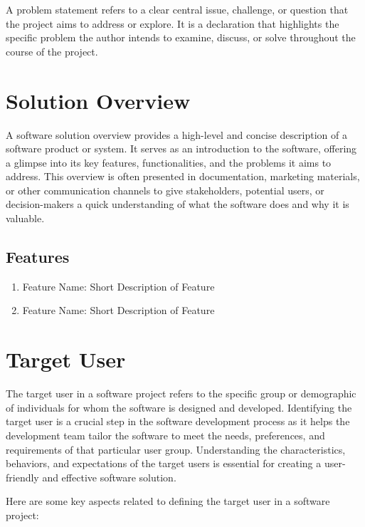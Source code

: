 A problem statement refers to a clear central issue,
challenge, or question that the project aims to address or explore. It is a
declaration that highlights the specific problem the author intends to examine,
discuss, or solve throughout the course of the project.

\section{Solution Overview}
\label{section:solution-overview}

A software solution overview provides a high-level and
concise description of a software product or system. It serves as an
introduction to the software, offering a glimpse into its key features,
functionalities, and the problems it aims to address. This overview is often
presented in documentation, marketing materials, or other communication
channels to give stakeholders, potential users, or decision-makers a quick
understanding of what the software does and why it is valuable.

\subsection{Features}
\label{subsection:features}

\begin{enumerate}[leftmargin=80pt]
    \item Feature Name: Short Description of Feature
    \item Feature Name: Short Description of Feature
\end{enumerate}

\section{Target User}
\label{section:target-user}

The target user in a software project refers to the specific
group or demographic of individuals for whom the software is designed and
developed. Identifying the target user is a crucial step in the software
development process as it helps the development team tailor the software to
meet the needs, preferences, and requirements of that particular user group.
Understanding the characteristics, behaviors, and expectations of the target
users is essential for creating a user-friendly and effective software solution.

Here are some key aspects related to defining the target user in a software project:

